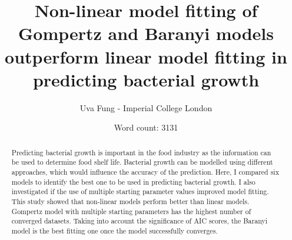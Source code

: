 \documentclass[11pt]{article}
\title{Non-linear model fitting of Gompertz and Baranyi models outperform linear model fitting in predicting bacterial growth}
\author{Uva Fung - Imperial College London}
\date{Word count: 3131}
\begin{document}
\begin{titlepage}
\maketitle
\end{titlepage}



\begin{abstract}
Predicting bacterial growth is important in the food industry as the information can be used to determine food shelf life. Bacterial growth can be modelled using different approaches, which would influence the accuracy of the prediction. Here, I compared six models to identify the best one to be used in predicting bacterial growth. I also investigated if the use of multiple starting parameter values improved model fitting. This study showed that non-linear models perform better than linear models. Gompertz model with multiple starting parameters has the highest number of converged datasets. Taking into account the significance of AIC scores, the Baranyi model is the best fitting one once the model successfully converges. 
\end{abstract} 
\end{document}
